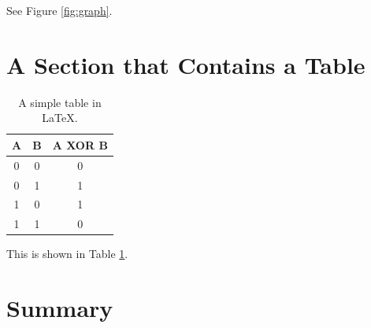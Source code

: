 See Figure \ref{fig:graph}.


\section{A Section that Contains a Table}

\lipsum  %

\begin{table}[ht]
\center
\begin{tabular}{cc|c}
A & B & A XOR B\\
\hline
0 & 0 & 0\\
0 & 1 & 1\\
1 & 0 & 1\\
1 & 1 & 0\\
\end{tabular}
\caption{A simple table in \LaTeX.}
\label{tab:xor}
\end{table}

\lipsum  %

This is shown in Table \ref{tab:xor}.


\section{Summary}

\lipsum  %
